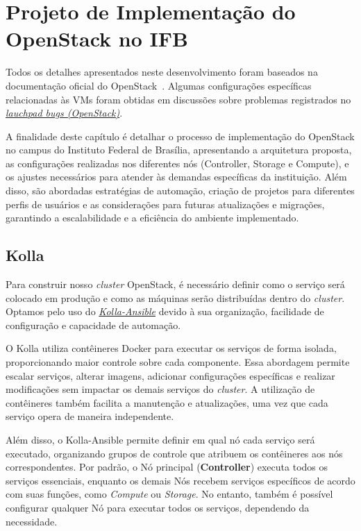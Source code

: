 \chapter{Projeto de Implementação do OpenStack no IFB}
\label{ref:implementation_project_openstack_ifb}

Todos os detalhes apresentados neste desenvolvimento foram baseados na documentação oficial do OpenStack~\citep{DocumentacaoOpenstack}. Algumas configurações específicas relacionadas às VMs foram obtidas em discussões sobre problemas registrados no \textit{\href{https://bugs.launchpad.net/openstack/}{lauchpad bugs (OpenStack)}}.

A finalidade deste capítulo é detalhar o processo de implementação do OpenStack no campus do Instituto Federal de Brasília, apresentando a arquitetura proposta, as configurações realizadas nos diferentes nós (Controller, Storage e Compute), e os ajustes necessários para atender às demandas específicas da instituição. Além disso, são abordadas estratégias de automação, criação de projetos para diferentes perfis de usuários e as considerações para futuras atualizações e migrações, garantindo a escalabilidade e a eficiência do ambiente implementado.


\section{Kolla}
Para construir nosso \textit{cluster} OpenStack, é necessário definir como o serviço será colocado em produção e como as máquinas serão distribuídas dentro do \textit{cluster}. Optamos pelo uso do \textit{\href{https://docs.openstack.org/kolla-ansible/latest/}{Kolla-Ansible}} devido à sua organização, facilidade de configuração e capacidade de automação.

O Kolla utiliza contêineres Docker para executar os serviços de forma isolada, proporcionando maior controle sobre cada componente. Essa abordagem permite escalar serviços, alterar imagens, adicionar configurações específicas e realizar modificações sem impactar os demais serviços do \textit{cluster}. A utilização de contêineres também facilita a manutenção e atualizações, uma vez que cada serviço opera de maneira independente.

Além disso, o Kolla-Ansible permite definir em qual nó cada serviço será executado, organizando grupos de controle que atribuem os contêineres aos nós correspondentes. Por padrão, o Nó principal (\textbf{Controller}) executa todos os serviços essenciais, enquanto os demais Nós recebem serviços específicos de acordo com suas funções, como \textit{Compute} ou \textit{Storage}. No entanto, também é possível configurar qualquer Nó para executar todos os serviços, dependendo da necessidade.

